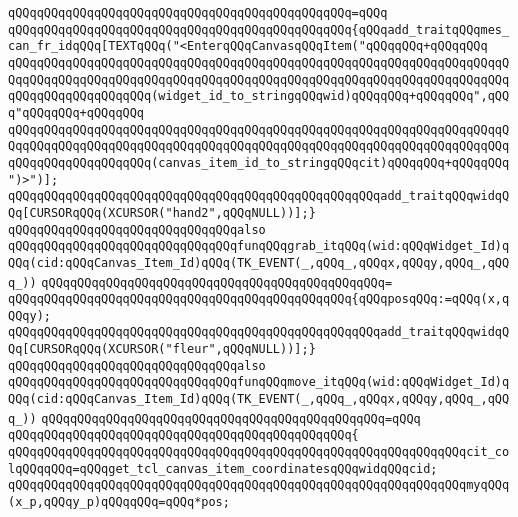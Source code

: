 \verb|qQQqqQQqqQQqqQQqqQQqqQQqqQQqqQQqqQQqqQQqqQQqqQQq=qQQq|\newline
\verb|qQQqqQQqqQQqqQQqqQQqqQQqqQQqqQQqqQQqqQQqqQQqqQQq{qQQqadd_traitqQQqmes_can_fr_idqQQq[TEXTqQQq("<EnterqQQqCanvasqQQqItem("qQQqqQQq+qQQqqQQq|\newline
\verb|qQQqqQQqqQQqqQQqqQQqqQQqqQQqqQQqqQQqqQQqqQQqqQQqqQQqqQQqqQQqqQQqqQQqqQQqqQQqqQQqqQQqqQQqqQQqqQQqqQQqqQQqqQQqqQQqqQQqqQQqqQQqqQQqqQQqqQQqqQQqqQQqqQQqqQQqqQQqqQQq(widget_id_to_stringqQQqwid)qQQqqQQq+qQQqqQQq",qQQq"qQQqqQQq+qQQqqQQq|\newline
\verb|qQQqqQQqqQQqqQQqqQQqqQQqqQQqqQQqqQQqqQQqqQQqqQQqqQQqqQQqqQQqqQQqqQQqqQQqqQQqqQQqqQQqqQQqqQQqqQQqqQQqqQQqqQQqqQQqqQQqqQQqqQQqqQQqqQQqqQQqqQQqqQQqqQQqqQQqqQQqqQQq(canvas_item_id_to_stringqQQqcit)qQQqqQQq+qQQqqQQq")>")];|\newline
\verb|qQQqqQQqqQQqqQQqqQQqqQQqqQQqqQQqqQQqqQQqqQQqqQQqqQQqadd_traitqQQqwidqQQq[CURSORqQQq(XCURSOR("hand2",qQQqNULL))];}|\newline
\newline
\verb|qQQqqQQqqQQqqQQqqQQqqQQqqQQqqQQqalso|\newline
\verb|qQQqqQQqqQQqqQQqqQQqqQQqqQQqqQQqfunqQQqgrab_itqQQq(wid:qQQqWidget_Id)qQQq(cid:qQQqCanvas_Item_Id)qQQq(TK_EVENT(_,qQQq_,qQQqx,qQQqy,qQQq_,qQQq_))|\newline
\verb|qQQqqQQqqQQqqQQqqQQqqQQqqQQqqQQqqQQqqQQqqQQqqQQq=|\newline
\verb|qQQqqQQqqQQqqQQqqQQqqQQqqQQqqQQqqQQqqQQqqQQqqQQq{qQQqposqQQq:=qQQq(x,qQQqy);|\newline
\verb|qQQqqQQqqQQqqQQqqQQqqQQqqQQqqQQqqQQqqQQqqQQqqQQqqQQqadd_traitqQQqwidqQQq[CURSORqQQq(XCURSOR("fleur",qQQqNULL))];}|\newline
\newline
\verb|qQQqqQQqqQQqqQQqqQQqqQQqqQQqqQQqalso|\newline
\verb|qQQqqQQqqQQqqQQqqQQqqQQqqQQqqQQqfunqQQqmove_itqQQq(wid:qQQqWidget_Id)qQQq(cid:qQQqCanvas_Item_Id)qQQq(TK_EVENT(_,qQQq_,qQQqx,qQQqy,qQQq_,qQQq_))|\newline
\verb|qQQqqQQqqQQqqQQqqQQqqQQqqQQqqQQqqQQqqQQqqQQqqQQq=qQQq|\newline
\verb|qQQqqQQqqQQqqQQqqQQqqQQqqQQqqQQqqQQqqQQqqQQqqQQq{|\newline
\verb|qQQqqQQqqQQqqQQqqQQqqQQqqQQqqQQqqQQqqQQqqQQqqQQqqQQqqQQqqQQqqQQqcit_colqQQqqQQq=qQQqget_tcl_canvas_item_coordinatesqQQqwidqQQqcid;|\newline
\verb|qQQqqQQqqQQqqQQqqQQqqQQqqQQqqQQqqQQqqQQqqQQqqQQqqQQqqQQqqQQqqQQqmyqQQq(x_p,qQQqy_p)qQQqqQQq=qQQq*pos;|\newline
